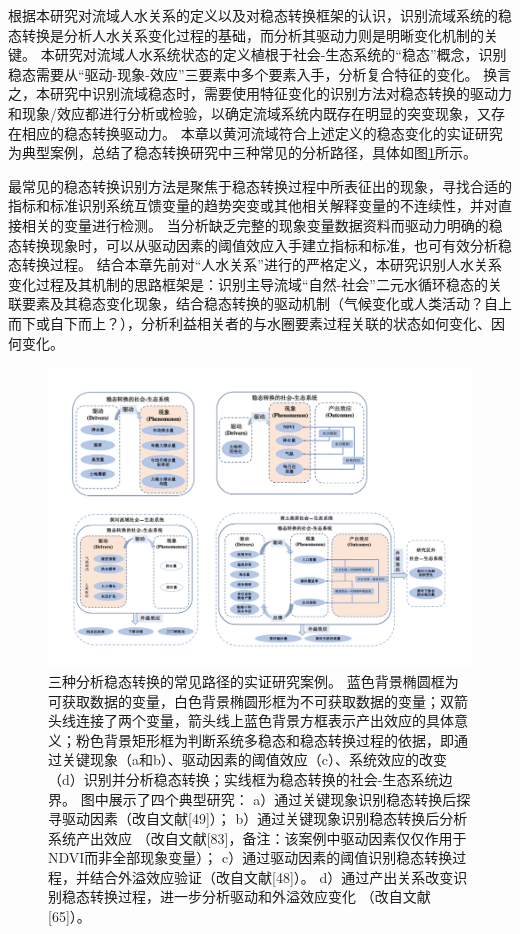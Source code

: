 根据本研究对流域人水关系的定义以及对稳态转换框架的认识，识别流域系统的稳态转换是分析人水关系变化过程的基础，而分析其驱动力则是明晰变化机制的关键。
本研究对流域人水系统状态的定义植根于社会-生态系统的“稳态”概念，识别稳态需要从“驱动-现象-效应”三要素中多个要素入手，分析复合特征的变化。
换言之，本研究中识别流域稳态时，需要使用特征变化的识别方法对稳态转换的驱动力和现象/效应都进行分析或检验，以确定流域系统内既存在明显的突变现象，又存在相应的稳态转换驱动力。
本章以黄河流域符合上述定义的稳态变化的实证研究为典型案例，总结了稳态转换研究中三种常见的分析路径，具体如图\ref{ch2:fig:identifying}所示。

最常见的稳态转换识别方法是聚焦于稳态转换过程中所表征出的现象，寻找合适的指标和标准识别系统互馈变量的趋势突变或其他相关解释变量的不连续性，并对直接相关的变量进行检测。
当分析缺乏完整的现象变量数据资料而驱动力明确的稳态转换现象时，可以从驱动因素的阈值效应入手建立指标和标准，也可有效分析稳态转换过程。
结合本章先前对“人水关系”进行的严格定义，本研究识别人水关系变化过程及其机制的思路框架是：识别主导流域“自然-社会”二元水循环稳态的关联要素及其稳态变化现象，结合稳态转换的驱动机制（气候变化或人类活动？自上而下或自下而上？），分析利益相关者的与水圈要素过程关联的状态如何变化、因何变化。

\begin{figure}[!htb] %
    \includegraphics[width=\textwidth]{img/ch2/ch2_identifying.png}
    \caption[三种分析稳态转换的常见路径的实证研究案例]{三种分析稳态转换的常见路径的实证研究案例。
    蓝色背景椭圆框为可获取数据的变量，白色背景椭圆形框为不可获取数据的变量；双箭头线连接了两个变量，箭头线上蓝色背景方框表示产出效应的具体意义；粉色背景矩形框为判断系统多稳态和稳态转换过程的依据，即通过关键现象（a和b）、驱动因素的阈值效应（c）、系统效应的改变（d）识别并分析稳态转换；实线框为稳态转换的社会-生态系统边界。
    图中展示了四个典型研究：
    a）通过关键现象识别稳态转换后探寻驱动因素（改自文献[49]）；
    b）通过关键现象识别稳态转换后分析系统产出效应 （改自文献[83]，备注：该案例中驱动因素仅仅作用于NDVI而非全部现象变量）；
    c）通过驱动因素的阈值识别稳态转换过程，并结合外溢效应验证（改自文献[48]）。
    d）通过产出关系改变识别稳态转换过程，进一步分析驱动和外溢效应变化 （改自文献[65]）。}\label{ch2:fig:identifying}
\end{figure}

